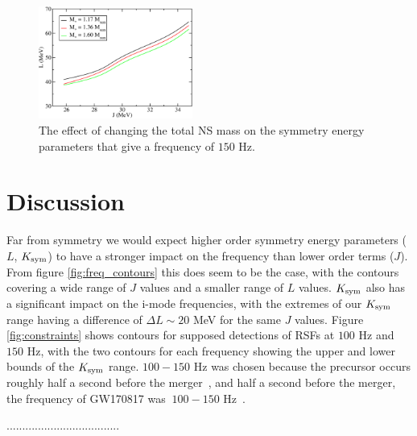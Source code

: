 \documentclass[fleqn,usenatbib]{mnras}
\begin{document}
\begin{figure}
\centering
\includegraphics[width=0.45\textwidth,angle=0]{K40_f150_Mcomp.pdf}
\caption{The effect of changing the total NS mass on the symmetry energy parameters that give a frequency of $150$ Hz.}
\label{fig:vary_mass_contours}
\end{figure}







\section{Discussion}
\hspace{\parindent}Far from symmetry we would expect higher order symmetry energy parameters ($L$, $K_{\rm sym}$) to have a stronger impact on the frequency than lower order terms ($J$). From figure \ref{fig:freq_contours} this does seem to be the case, with the contours covering a wide range of $J$ values and a smaller range of $L$ values. $K_{\rm sym}$ also has a significant impact on the i-mode frequencies, with the extremes of our $K_{\rm sym}$ range having a difference of $\Delta L\sim 20$ MeV for the same $J$ values. Figure \ref{fig:constraints} shows contours for supposed detections of RSFs at $100$ Hz and $150$ Hz, with the two contours for each frequency showing the upper and lower bounds of the $K_{\rm sym}$ range. $100-150$ Hz was chosen because the precursor occurs roughly half a second before the merger~\cite{zhong2019precursors}, and half a second before the merger, the frequency of GW170817 was $~100-150$ Hz~\cite{abbott2017merger}.

\hspace{\parindent}....................................
\end{document}
